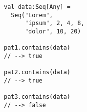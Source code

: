 \begin{lstlisting}[style=reclojureScala]
val data:Seq[Any] = 
  Seq("Lorem",
      "ipsum", 2, 4, 8,
      "dolor", 10, 20)

pat1.contains(data)
// --> true

pat2.contains(data)
// --> true

pat3.contains(data)
// --> false
\end{lstlisting}
